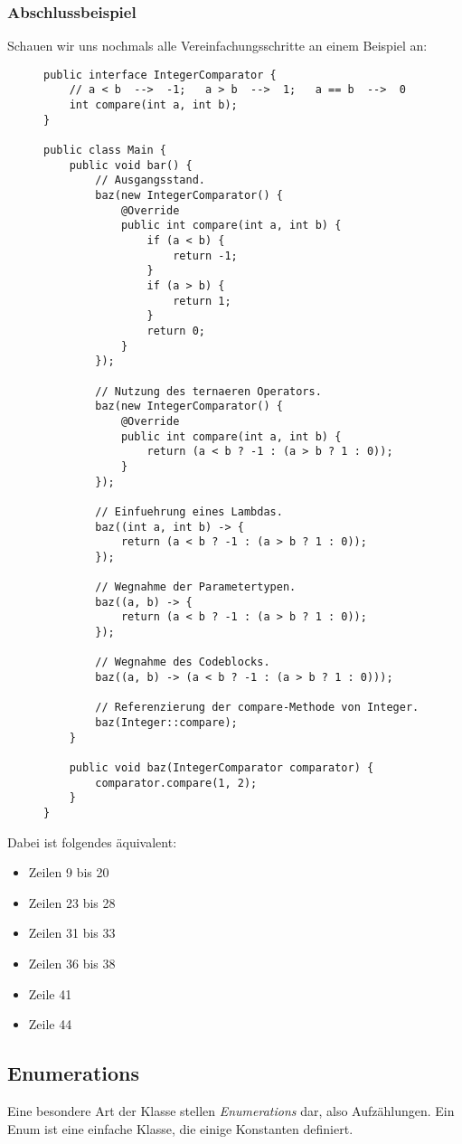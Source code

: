 	\subsubsection{Abschlussbeispiel}
		Schauen wir uns nochmals alle Vereinfachungsschritte an einem Beispiel an:
		\begin{figure}[H]
			\centering
			\begin{lstlisting}
public interface IntegerComparator {
	// a < b  -->  -1;   a > b  -->  1;   a == b  -->  0
	int compare(int a, int b);
}

public class Main {
	public void bar() {
		// Ausgangsstand.
		baz(new IntegerComparator() {
			@Override
			public int compare(int a, int b) {
				if (a < b) {
					return -1;
				}
				if (a > b) {
					return 1;
				}
				return 0;
			}
		});

		// Nutzung des ternaeren Operators.
		baz(new IntegerComparator() {
			@Override
			public int compare(int a, int b) {
				return (a < b ? -1 : (a > b ? 1 : 0));
			}
		});

		// Einfuehrung eines Lambdas.
		baz((int a, int b) -> {
			return (a < b ? -1 : (a > b ? 1 : 0));
		});

		// Wegnahme der Parametertypen.
		baz((a, b) -> {
			return (a < b ? -1 : (a > b ? 1 : 0));
		});

		// Wegnahme des Codeblocks.
		baz((a, b) -> (a < b ? -1 : (a > b ? 1 : 0)));

		// Referenzierung der compare-Methode von Integer.
		baz(Integer::compare);
	}
	
	public void baz(IntegerComparator comparator) {
		comparator.compare(1, 2);
	}
}
\end{lstlisting}
		\end{figure}
		Dabei ist folgendes äquivalent:
		\begin{itemize}
			\item Zeilen 9 bis 20
			\item Zeilen 23 bis 28
			\item Zeilen 31 bis 33
			\item Zeilen 36 bis 38
			\item Zeile 41
			\item Zeile 44
		\end{itemize}

\subsection{Enumerations}
	Eine besondere Art der Klasse stellen \textit{Enumerations} dar, also Aufzählungen. Ein Enum ist eine einfache Klasse, die einige Konstanten definiert.
	
